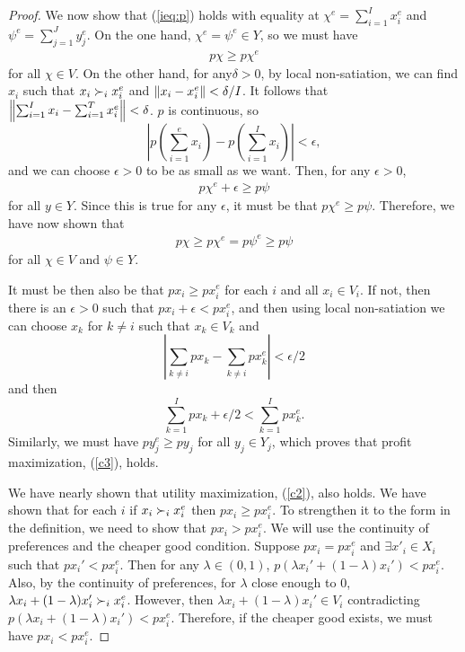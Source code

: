 \begin{proof}
  We now show that (\ref{ieq:p}) holds with equality at $\chi^e =
  \sum_{i=1}^I x_i^e$ and $\psi^e = \sum_{j=1}^J y_j^e$. On the
  one hand, $\chi^e = \psi^e \in Y$, so we must have 
  \begin{align*}
    p \chi \geq p \chi^e 
  \end{align*}
  for all $\chi \in V$. On the other hand, for any$\delta > 0$, by
  local non-satiation, we can find $x_i$ such that $x_i \succ_i x_i^e$
  and $\left\Vert {x_i - x_i^e} \right\Vert<\delta/I$. It follows that
  $\left\Vert {\sum_{i=1}^I x_i - \sum_{i=1}^T x_i^e } \right\Vert < \delta$. $p$ is
  continuous, so
  \[
  \left\vert p\left( \sum_{i=1}^e x_i \right) - p\left(\sum_{i=1}^I
      x_i\right) \right\vert < \epsilon,
  \]
  and we can choose $\epsilon>0$ to be as small as we want. 
  Then, for any $\epsilon >0$, 
  \begin{align*}
    p \chi^e + \epsilon \geq p \psi
  \end{align*}
  for all $y \in Y$. Since this is true for any $\epsilon$, it must be
  that $p \chi^e \geq p \psi$. Therefore, we have now shown
  that
  \begin{align}
    p\chi \geq p \chi^e = p \psi^e \geq p \psi
  \end{align}  
  for all $\chi \in V$ and $\psi \in Y$. 

  It must be then also be that $p x_i \geq p x_i^e $ for each $i$ and
  all $x_i \in V_i$. If not, then there is an $\epsilon>0$ such that
  $p x_i + \epsilon < p x_i^e$, and then using local non-satiation we
  can choose $x_k$ for $k\neq i$ such that $x_k \in V_k$ and 
  \[\left| \sum_{
      k \neq i } px_k - \sum_{k \neq i } p x_k^e \right| < \epsilon/2
  \]
  and then 
  \[ \sum_{k=1}^I p x_k + \epsilon/2 < \sum_{k=1}^I p x_k^e. \]
  Similarly, we must have $p y_j^e \geq p y_j$ for all $y_j \in Y_j$,
  which proves that profit maximization, (\ref{c3}), holds. 

  We have nearly shown that utility maximization, (\ref{c2}), also
  holds. We have shown that for each $i$ if $x_i \succ_i x_i^e$ then
  $p x_i \geq p x_i^e$. To strengthen it to the form in the
  definition, we need to show that $px_i > p x_i^e$. We will use the
  continuity of preferences and the cheaper good condition. Suppose $p
  x_i = p x_i^e$ and $\exists x'_i \in X_i$ such that $p x_i' < p
  x_i^e$. Then for any $\lambda \in (0,1)$, $p(\lambda x_i'
  +(1-\lambda) x_i') < p x_i^e$. Also, by the continuity of
  preferences, for $\lambda$ close enough to $0$, $\lambda x_i +
  (1-\lambda)x_i' \succ_i x_i^e$. However, then $\lambda x_i +
  (1-\lambda) x_i' \in V_i$ contradicting $p(\lambda x_i
  +(1-\lambda) x_i') < p x_i^e$. Therefore, if the cheaper good
  exists, we must have $p x_i < p x_i^e$.   
\end{proof}


